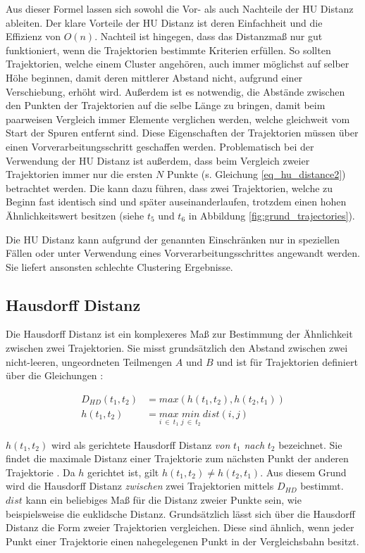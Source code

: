 Aus dieser Formel lassen sich sowohl die Vor- als auch Nachteile der HU Distanz ableiten. Der klare Vorteile der
HU Distanz ist deren Einfachheit und die Effizienz von $O(n)$.
Nachteil ist hingegen, dass das Distanzmaß nur gut funktioniert, wenn die Trajektorien bestimmte
Kriterien erfüllen. So sollten Trajektorien, welche einem Cluster angehören, auch immer möglichst auf selber Höhe beginnen,
damit deren mittlerer Abstand nicht, aufgrund einer Verschiebung, erhöht wird.
Außerdem ist es notwendig, die Abstände zwischen den Punkten der Trajektorien auf die selbe Länge zu bringen,
damit beim paarweisen Vergleich immer Elemente verglichen werden, welche gleichweit vom Start der Spuren entfernt sind.
Diese Eigenschaften der Trajektorien müssen über einen Vorverarbeitungsschritt geschaffen werden.
Problematisch bei der Verwendung der HU Distanz ist außerdem, dass beim Vergleich zweier Trajektorien immer nur
die ersten $N$ Punkte (s. Gleichung \ref{eq_hu_distance2}) betrachtet werden. Die kann dazu führen, dass zwei
Trajektorien, welche zu Beginn fast identisch sind und später auseinanderlaufen, trotzdem einen hohen Ähnlichkeitswert besitzen
(siehe $t_5$ und $t_6$ in Abbildung \ref{fig:grund_trajectories}).

Die HU Distanz kann aufgrund der genannten Einschränken nur in speziellen Fällen oder unter Verwendung eines
Vorverarbeitungsschrittes angewandt werden. Sie liefert ansonsten schlechte Clustering Ergebnisse.

\subsection{Hausdorff Distanz}
\label{sec:hausdorff_distance}

Die Hausdorff Distanz ist ein komplexeres Maß zur Bestimmung der Ähnlichkeit zwischen zwei Trajektorien.
Sie misst grundsätzlich den Abstand zwischen zwei nicht-leeren, ungeordneten Teilmengen $A$ und $B$ und ist für
Trajektorien definiert über die Gleichungen \cite[]{Atev2010}:

\begin{ceqn}
\begin{align}
\label{eq_hausdorff1}
    D_{HD}(t_1, t_2) &= max(h(t_1, t_2), h(t_2, t_1)) \\
\label{eq_hausdorff2}
    h(t_1, t_2) &= \underset{i\ \in\ t_1}{max}\ \underset{j\ \in\ t_2}{min}\ dist(i, j)
\end{align}
\end{ceqn}

$h(t_1, t_2)$ wird als gerichtete Hausdorff Distanz \textit{von} $t_1$ \textit{nach} $t_2$ bezeichnet.
Sie findet die maximale Distanz einer Trajektorie zum nächsten Punkt der anderen Trajektorie \cite[]{Huttenlocher}.
Da $h$ gerichtet ist, gilt $h(t_1, t_2) \neq h(t_2, t_1)$. Aus diesem Grund wird die Hausdorff Distanz
\textit{zwischen} zwei Trajektorien mittels $D_{HD}$ bestimmt. $dist$ kann ein beliebiges Maß für die Distanz zweier
Punkte sein, wie beispielsweise die euklidsche Distanz.
Grundsätzlich lässt sich über die Hausdorff Distanz die Form zweier Trajektorien vergleichen. Diese sind ähnlich,
wenn jeder Punkt einer Trajektorie einen nahegelegenen Punkt in der Vergleichsbahn besitzt.

